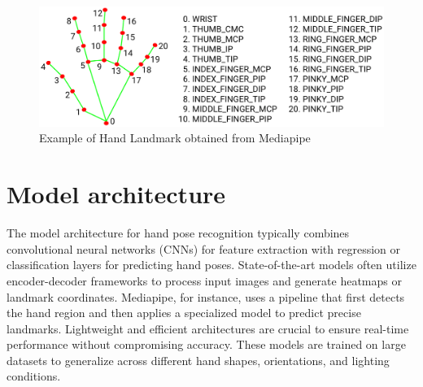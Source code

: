 \begin{figure}[h!]
	\centering
	\includegraphics[width=\linewidth]{img/hand_landmarks} %
	\caption{Example of Hand Landmark obtained from Mediapipe}
	\label{fig:hand_landmark} %
\end{figure}

\section{Model architecture}
The model architecture for hand pose recognition typically combines convolutional neural networks (CNNs) for feature extraction with regression or classification layers for predicting hand poses. State-of-the-art models often utilize encoder-decoder frameworks to process input images and generate heatmaps or landmark coordinates. Mediapipe, for instance, uses a pipeline that first detects the hand region and then applies a specialized model to predict precise landmarks. Lightweight and efficient architectures are crucial to ensure real-time performance without compromising accuracy. These models are trained on large datasets to generalize across different hand shapes, orientations, and lighting conditions.

